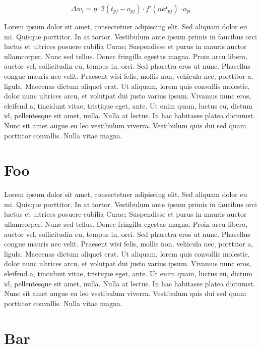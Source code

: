 \[
	\Delta w_i = \eta \cdot 2(t_{pj} - o_{pj}) \cdot f'(net_{pj}) \cdot o_{pi}
\]



\newpage

Lorem ipsum dolor sit amet, consectetuer adipiscing elit. Sed
aliquam dolor eu mi. Quisque porttitor. In at tortor. Vestibulum
ante ipsum primis in faucibus orci luctus et ultrices posuere
cubilia Curae; Suspendisse et purus in mauris auctor ullamcorper.
Nunc sed tellus. Donec fringilla egestas magna. Proin arcu libero,
auctor vel, sollicitudin eu, tempus in, orci. Sed pharetra eros ut
nunc. Phasellus congue mauris nec velit. Praesent wisi felis, mollis
non, vehicula nec, porttitor a, ligula. Maecenas dictum aliquet
erat. Ut aliquam, lorem quis convallis molestie, dolor nunc ultrices
arcu, et volutpat dui justo varius ipsum. Vivamus nunc eros,
eleifend a, tincidunt vitae, tristique eget, ante. Ut enim quam,
luctus eu, dictum id, pellentesque sit amet, nulla. Nulla at lectus.
In hac habitasse platea dictumst. Nunc sit amet augue eu leo
vestibulum viverra. Vestibulum quis dui sed quam porttitor
convallis. Nulla vitae magna.

\section{Foo}

Lorem ipsum dolor sit amet, consectetuer adipiscing elit. Sed
aliquam dolor eu mi. Quisque porttitor. In at tortor. Vestibulum
ante ipsum primis in faucibus orci luctus et ultrices posuere
cubilia Curae; Suspendisse et purus in mauris auctor ullamcorper.
Nunc sed tellus. Donec fringilla egestas magna. Proin arcu libero,
auctor vel, sollicitudin eu, tempus in, orci. Sed pharetra eros ut
nunc. Phasellus congue mauris nec velit. Praesent wisi felis, mollis
non, vehicula nec, porttitor a, ligula. Maecenas dictum aliquet
erat. Ut aliquam, lorem quis convallis molestie, dolor nunc ultrices
arcu, et volutpat dui justo varius ipsum. Vivamus nunc eros,
eleifend a, tincidunt vitae, tristique eget, ante. Ut enim quam,
luctus eu, dictum id, pellentesque sit amet, nulla. Nulla at lectus.
In hac habitasse platea dictumst. Nunc sit amet augue eu leo
vestibulum viverra. Vestibulum quis dui sed quam porttitor
convallis. Nulla vitae magna.

\section{Bar}


